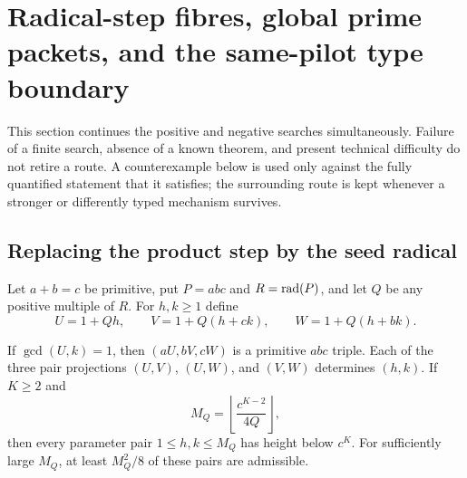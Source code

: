 \section{Radical-step fibres, global prime packets, and the same-pilot type boundary}
\label{sec:global-packets-same-pilot}

This section continues the positive and negative searches simultaneously.
Failure of a finite search, absence of a known theorem, and present technical
difficulty do not retire a route.  A counterexample below is used only against
the fully quantified statement that it satisfies; the surrounding route is
kept whenever a stronger or differently typed mechanism survives.

\subsection{Replacing the product step by the seed radical}

Let $a+b=c$ be primitive, put $P=abc$ and $R=\operatorname{rad}(P)$, and let $Q$ be any
positive multiple of $R$.  For $h,k\geq1$ define
\begin{equation}\label{eq:gpsp-radical-shear}
 U=1+Qh,\qquad V=1+Q(h+ck),\qquad W=1+Q(h+bk).
\end{equation}

\begin{theorem}
\label{thm:gpsp-radical-shear}
If $\gcd(U,k)=1$, then $(aU,bV,cW)$ is a primitive $abc$ triple.  Each of
the three pair projections $(U,V)$, $(U,W)$, and $(V,W)$ determines $(h,k)$.
If $K\geq2$ and
\[
 M_Q=\left\lfloor\frac{c^{K-2}}{4Q}\right\rfloor,
\]
then every parameter pair $1\leq h,k\leq M_Q$ has height below $c^K$.
For sufficiently large $M_Q$, at least $M_Q^2/8$ of these pairs are
admissible.
\end{theorem}

